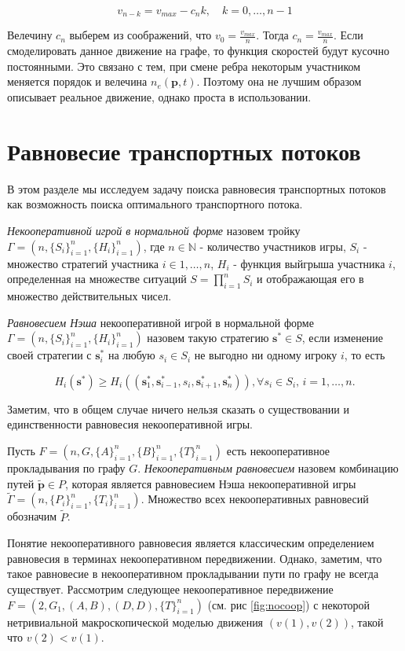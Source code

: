 \documentclass[12pt, a4paper]{article}
\begin{document}
$$v_{n - k} = v_{max} - c_n k, \quad k = 0, \dots, n - 1$$

Велечину $c_n$ выберем из соображений, что $v_0 = \frac{v_{max}}{n}$. Тогда $c_n = \frac{v_{max}}{n}$. Если смоделировать данное движение на графе, то функция скоростей будут кусочно постоянными. Это связано с тем, при смене ребра некоторым участником меняется порядок и велечина $n_e(\textbf{p}, t)$. Поэтому она не лучшим образом описывает реальное движение, однако проста в использовании.

\section{Равновесие транспортных потоков}
В этом разделе мы исследуем задачу поиска равновесия транспортных потоков как возможность поиска оптимального транспортного потока.

\textit{Некооперативной игрой в нормальной форме} назовем тройку $\Gamma = (n, \{S_i\}_{i = 1}^n, \{H_i\}_{i = 1}^n)$, где $n \in \mathbb{N}$ - количество участников игры, $S_i$ - множество стратегий участника $i \in {1, \dots, n}$, $H_i$ - функция выйгрыша участника $i$, определенная на множестве ситуаций $S = \prod\limits_{i = 1}^n S_i$ и отображающая его в множество действительных чисел.

\textit{Равновесием Нэша} некооперативной игрой в нормальной форме $\Gamma = (n, \{S_i\}_{i = 1}^n, \{H_i\}_{i = 1}^n)$ назовем такую стратегию $\textbf{s}^* \in S$, если изменение своей стратегии с $\textbf{s}_i^*$ на любую $s_i \in S_i$ не выгодно ни одному игроку $i$, то есть

$$H_i(\textbf{s}^*) \ge H_i(\left(\textbf{s}^*_1, \textbf{s}^*_{i - 1}, s_i, \textbf{s}^*_{i + 1}, \textbf{s}^*_{n} \right)), \forall s_i \in S_i, \, i = 1, \dots, n. $$ 

Заметим, что в общем случае ничего нельзя сказать о существовании и единственности равновесия некооперативной игры.

Пусть $F = (n, G, \{A\}_{i = 1}^{n}, \{B\}_{i = 1}^{n}, \{T\}_{i = 1}^{n})$ есть некооперативное прокладывания  по графу $G$. \textit{Некооперативным равновесием} назовем комбинацию путей $\widetilde{\textbf{p}} \in P$, которая является равновесием Нэша некооперативной игры $\widetilde{\Gamma} = (n, \{P_i\}_{i = 1}^n, \{T_i\}_{i = 1}^n)$. Множество всех некооперативных равновесий обозначим $\widetilde{P}$.

Понятие некооперативного равновесия является классическим определением равновесия в терминах некооперативном передвижении. Однако, заметим, что такое равновесие в некооперативном прокладывании пути по графу не всегда существует. Рассмотрим следующее некооперативное передвижение $F = (2, G_1, (A, B), (D, D), \{T\}_{i = 1}^{n})$ (см. рис \ref{fig:nocoop}) с некоторой нетривиальной макроскопической моделью движения $(v(1), v(2))$, такой что $v(2) < v(1)$.
\end{document}
